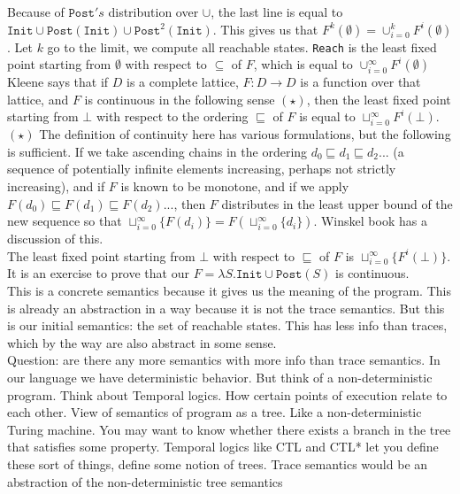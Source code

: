 \documentclass[11pt]{article}
\theoremstyle{definition}
\theoremstyle{plain}
\newcommand{\bottom}{\bot}
\begin{document}
\noindent Because of $\texttt{Post}'s$ distribution over $\cup$, the last line is equal to
$\texttt{Init} \cup \texttt{Post}(\texttt{Init}) \cup \texttt{Post}^2(\texttt{Init}).$ This gives us that
$F^k(\emptyset) = \cup_{i=0}^k F^i(\emptyset)$. Let $k$ go to the limit, we compute all reachable states.
\texttt{Reach} is the least fixed point starting from $\emptyset$  with respect to $\subseteq$ of $F$, which is equal to  $\cup_{i=0}^{\infty} F^i(\emptyset)$\\

\noindent Kleene says that if $D$ is a complete lattice, $F: D \rightarrow D$ is a function over that lattice, and $F$ is continuous in the following sense $(\star)$,
then the least fixed point starting from $\bottom$ with respect to the ordering $\sqsubseteq$ of $F$ is equal to $\sqcup_{i=0}^\infty F^i(\bottom)$.\\

\noindent $(\star)$ The definition of continuity here has various formulations, but the following is sufficient. If we take ascending chains 
in the ordering $d_0 \sqsubseteq d_1 \sqsubseteq d_2 ...$ (a sequence of potentially infinite elements increasing, perhaps not strictly increasing),
and if $F$ is known to be monotone,
and if we apply $F(d_0) \sqsubseteq F(d_1) \sqsubseteq F(d_2) ... $,
then $F$ distributes in the least upper bound of the new sequence so that $\sqcup_{i=0}^\infty\{F(d_i)\} = F(\sqcup_{i=0}^\infty\{d_i\})$. Winskel book has a discussion of this.\\

\noindent The least fixed point starting from $\bottom$ with respect to $\sqsubseteq$ of $F$ is $\sqcup_{i=0}^\infty\{F^i(\bottom)\}$.
It is an exercise to prove that our $F = \lambda S. \texttt{Init} \cup \texttt{Post}(S)$ is continuous.\\

\noindent This is a concrete semantics because it gives us the meaning of the program. This is already an abstraction in a way because it is not the trace semantics.
But this is our initial semantics: the set of reachable states. This has less info than traces, which by the way are also abstract in some sense.\\

\noindent Question: are there any more semantics with more info than trace semantics. 
In our language we have deterministic behavior. But think of a non-deterministic program.
Think about Temporal logics. How certain points of execution relate to each other. View of semantics of program as a tree. Like a non-deterministic Turing machine.
You may want to know whether there exists a branch in the tree that satisfies some property. Temporal logics like CTL and CTL* let you 
define these sort of things, define some notion of trees. Trace semantics would be an abstraction of the non-deterministic tree semantics\\
\end{document}
